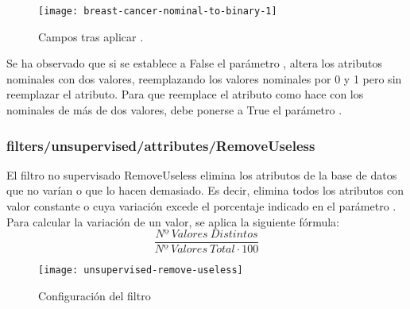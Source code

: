\begin{figure}[ht]
    \centering
    \texttt{[image: breast-cancer-nominal-to-binary-1]}
    \caption{Campos tras aplicar .}
    \label{fig:breast-cancer-nominal-to-binary-1}
\end{figure}

Se ha observado que si se establece a False el parámetro \code{}, altera los atributos nominales con dos valores, reemplazando los valores nominales por 0 y 1 pero sin reemplazar el atributo. Para que reemplace el atributo como hace con los nominales de más de dos valores, debe ponerse a True el parámetro .

\subsubsection{filters/unsupervised/attributes/RemoveUseless}
El filtro no supervisado RemoveUseless elimina los atributos de la base de datos que no varían o que lo hacen demasiado. Es decir, elimina todos los atributos con valor constante o cuya variación excede el porcentaje indicado en el parámetro . Para calcular la variación de un valor, se aplica la siguiente fórmula:
\begin{equation*}
\dfrac{Nº\ Valores\ Distintos}{Nº\ Valores\ Total\cdot100}
\end{equation*}

\begin{figure}[ht]
    \centering
    \texttt{[image: unsupervised-remove-useless]}
    \caption{Configuración del filtro }
    \label{fig:unsupervised-remove-useless}
\end{figure}


